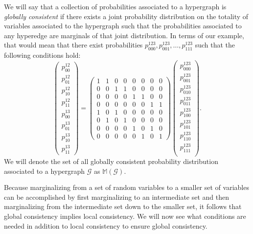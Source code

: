 We will say that a collection of probabilities associated to a
hypergraph is \emph{globally consistent} if there exists a joint
probability distribution on the totality of variables associated to
the hypergraph such that the probabilities associated to any hyperedge
are marginals of that joint distribution.  In terms of our example,
that would mean that there exist probabilities $p^{123}_{000},
p^{123}_{001}, \ldots, p^{123}_{111}$ such that the following
conditions hold:
\begin{equation}
 \begin{pmatrix}
  p^{12}_{00}\\
  p^{12}_{01}\\
  p^{12}_{10}\\
  p^{12}_{11}\\
  p^{13}_{00}\\
  p^{13}_{01}\\
  p^{13}_{10}\\
  p^{13}_{11}
 \end{pmatrix} =
 \begin{pmatrix}
  1 & 1 & 0 & 0 & 0 & 0 & 0 & 0\\
  0 & 0 & 1 & 1 & 0 & 0 & 0 & 0\\
  0 & 0 & 0 & 0 & 1 & 1 & 0 & 0\\
  0 & 0 & 0 & 0 & 0 & 0 & 1 & 1\\
  1 & 0 & 1 & 0 & 0 & 0 & 0 & 0\\
  0 & 1 & 0 & 1 & 0 & 0 & 0 & 0\\
  0 & 0 & 0 & 0 & 1 & 0 & 1 & 0\\
  0 & 0 & 0 & 0 & 0 & 1 & 0 & 1
 \end{pmatrix}
 \begin{pmatrix}
  p^{123}_{000}\\
  p^{123}_{001}\\
  p^{123}_{010}\\
  p^{123}_{011}\\
  p^{123}_{100}\\
  p^{123}_{101}\\
  p^{123}_{110}\\
  p^{123}_{111}\\
 \end{pmatrix}.
\end{equation}
We will denote the set of all globally consistent probability
distribution associated to a hypergraph $\mathcal{G}$ as
$\mathbb{M}(\mathcal{G})$.

Because marginalizing from a set of random variables to a smaller set
of variables can be accomplished by first marginalizing to an
intermediate set and then marginalizing from the intermediate set down
to the smaller set, it follows that global consistency implies local
consistency.  We will now see what conditions are needed in
addition to local consistency to ensure global consistency.

